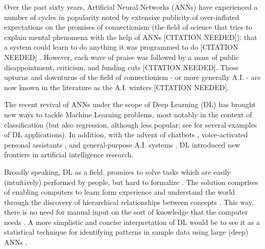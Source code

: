 \documentclass[a4paper]{book}
\begin{document}
Over the past sixty years, Artificial Neural Networks (ANNs) have experienced a number of cycles in popularity noted by extensive publicity of over-inflated expectations on the promises of connectionism (the field of science that tries to explain mental phenomena with the help of ANNs [CITATION NEEDED]): that a system could learn to do anything it was programmed to do [CITATION NEEDED] \parencite{minsky_perceptrons_1988}. However, each wave of praise was followed by a mass of public disappointment, criticism, and funding cuts [CITATION NEEDED]. These upturns and downturns of the field of connectionism - or more generally A.I. - are now known in the literature as the A.I. winters [CITATION NEEDED].

The recent revival of ANNs under the scope of Deep Learning (DL) has brought new ways to tackle Machine Learning problems, most notably in the context of classification (but also regression, although less popular; see \cite{lecun_deep_2015} for several examples of DL applications). In addition, with the advent of chatbots \parencite{dale_return_2016}, voice-activated personal assistants \parencite{xiong_microsoft_2018}, and general-purpose A.I. systems \parencite{vinyals_starcraft_2017}, DL introduced new frontiers in artificial intelligence research.


Broadly speaking, DL as a field, promises to solve tasks which are easily (intuitively) performed by people, but hard to formalize \parencite[e.g., recognizing faces or spoken word;][]{goodfellow_deep_2016}. The solution comprises of enabling computers to learn form experience and understand the world through the discovery of hierarchical relationships between concepts \parencite{lecun_deep_2015}. This way, there is no need for manual input on the sort of knowledge that the computer needs \parencite{goodfellow_deep_2016}. A more simplistic and concise interpretation of DL would be to see it as a statistical technique for identifying patterns in sample data using large (deep) ANNs \parencite{marcus_deep_2018}.
\end{document}
